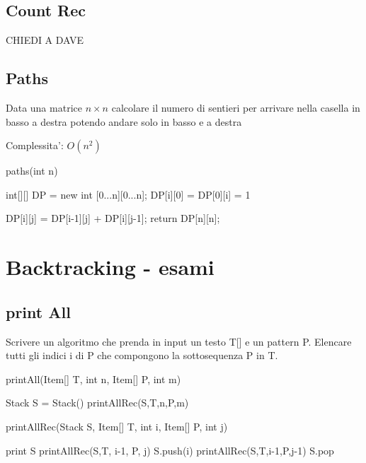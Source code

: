 \documentclass[oneside]{book}
\begin{document}
\section{Count Rec}

CHIEDI A DAVE


\newpage
\section{Paths}
Data una matrice $n{\times}n$ calcolare il numero di sentieri per arrivare nella casella in basso a destra potendo andare solo in basso e a destra

Complessita': $O(n^2)$

\begin{algorithm}
\caption{paths(int n)\label{alg:cap}}
\begin{algorithmic}
\State int[][] DP = new int [0...n][0...n];
	\State DP[i][0] = DP[0][i] = 1
\EndFor

		\State DP[i][j] = DP[i-1][j] + DP[i][j-1];
	\EndFor
\EndFor
return DP[n][n];
\end{algorithmic}
\end{algorithm}


\chapter{Backtracking - esami}

\section{print All}
Scrivere un algoritmo che prenda in input un testo T[] e un pattern P. Elencare tutti gli indici i di P che compongono la sottosequenza P in T.

\begin{algorithm}
\caption{printAll(Item[] T, int n, Item[] P, int m)\label{alg:cap}}
\begin{algorithmic}
\State Stack S = Stack()
\State printAllRec(S,T,n,P,m)
\end{algorithmic}
\end{algorithm}


\begin{algorithm}
\caption{printAllRec(Stack S, Item[] T, int i, Item[] P, int j)\label{alg:cap}}
\begin{algorithmic}
	print S
	\State printAllRec(S,T, i-1, P, j)
		\State S.push(i)
		\State printAllRec(S,T,i-1,P,j-1)
		\State S.pop
	\EndIf
\EndIf
\end{algorithmic}
\end{algorithm}
\end{document}
